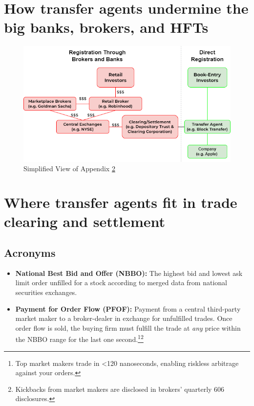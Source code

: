 \documentclass[11pt, english]{article}
\begin{document}
\pagebreak
\begin{multicols}{2}

\footnotesize{
    
    
}

\end{multicols}

\appendix



\section{How transfer agents undermine the big banks, brokers, and HFTs}

\begin{figure}[H]
    \centering
    \includegraphics[width=400pt]{simplified.png}
    \caption{Simplified View of Appendix \ref{appendix-brokers}}
\end{figure}
\pagebreak



\section{Where transfer agents fit in trade clearing and settlement}\label{appendix-brokers}


\subsection*{Acronyms}

\begin{itemize}
  \item \textbf{National Best Bid and Offer (NBBO):} The highest bid and lowest ask limit order unfilled for a stock according to merged data from national securities exchanges.
  
  \item \textbf{Payment for Order Flow (PFOF):} Payment from a central third-party market maker to a broker-dealer in exchange for unfulfilled trades. Once order flow is sold, the buying firm must fulfill the trade at \textit{any} price within the NBBO range for the last one second.\footnote{Top market makers trade in <120 nanoseconds, enabling riskless arbitrage against your orders.}\footnote{Kickbacks from market makers are disclosed in brokers' quarterly 606 disclosures.}
\end{itemize}
\end{document}
